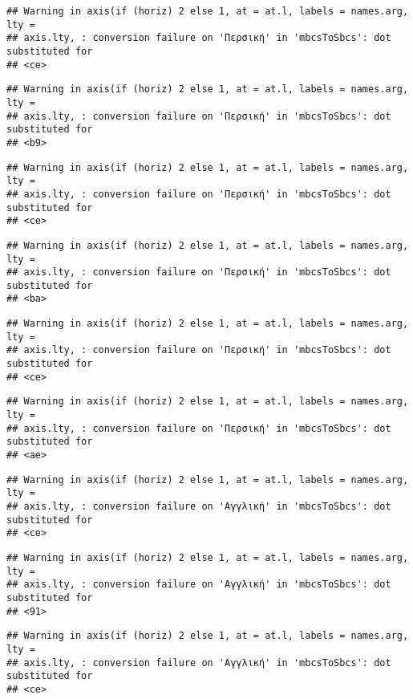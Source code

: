 \documentclass[
]{article}
\begin{document}
\begin{verbatim}
## Warning in axis(if (horiz) 2 else 1, at = at.l, labels = names.arg, lty =
## axis.lty, : conversion failure on 'Περσική' in 'mbcsToSbcs': dot substituted for
## <ce>
\end{verbatim}

\begin{verbatim}
## Warning in axis(if (horiz) 2 else 1, at = at.l, labels = names.arg, lty =
## axis.lty, : conversion failure on 'Περσική' in 'mbcsToSbcs': dot substituted for
## <b9>
\end{verbatim}

\begin{verbatim}
## Warning in axis(if (horiz) 2 else 1, at = at.l, labels = names.arg, lty =
## axis.lty, : conversion failure on 'Περσική' in 'mbcsToSbcs': dot substituted for
## <ce>
\end{verbatim}

\begin{verbatim}
## Warning in axis(if (horiz) 2 else 1, at = at.l, labels = names.arg, lty =
## axis.lty, : conversion failure on 'Περσική' in 'mbcsToSbcs': dot substituted for
## <ba>
\end{verbatim}

\begin{verbatim}
## Warning in axis(if (horiz) 2 else 1, at = at.l, labels = names.arg, lty =
## axis.lty, : conversion failure on 'Περσική' in 'mbcsToSbcs': dot substituted for
## <ce>
\end{verbatim}

\begin{verbatim}
## Warning in axis(if (horiz) 2 else 1, at = at.l, labels = names.arg, lty =
## axis.lty, : conversion failure on 'Περσική' in 'mbcsToSbcs': dot substituted for
## <ae>
\end{verbatim}

\begin{verbatim}
## Warning in axis(if (horiz) 2 else 1, at = at.l, labels = names.arg, lty =
## axis.lty, : conversion failure on 'Αγγλική' in 'mbcsToSbcs': dot substituted for
## <ce>
\end{verbatim}

\begin{verbatim}
## Warning in axis(if (horiz) 2 else 1, at = at.l, labels = names.arg, lty =
## axis.lty, : conversion failure on 'Αγγλική' in 'mbcsToSbcs': dot substituted for
## <91>
\end{verbatim}

\begin{verbatim}
## Warning in axis(if (horiz) 2 else 1, at = at.l, labels = names.arg, lty =
## axis.lty, : conversion failure on 'Αγγλική' in 'mbcsToSbcs': dot substituted for
## <ce>
\end{verbatim}
\end{document}
